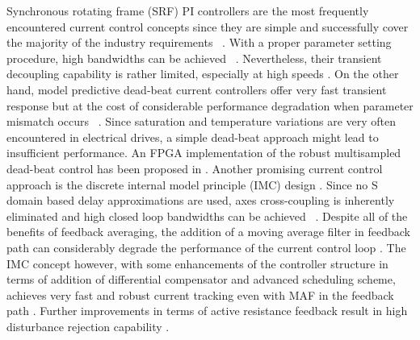 \documentclass[journal]{IEEEtran}
\begin{document}
Synchronous rotating frame (SRF) PI controllers are the most frequently encountered current control concepts since they are simple and successfully cover the majority of the industry requirements ~\cite{rowan1986,bae2003,yepes2014}. With a proper parameter setting procedure, high bandwidths can be achieved ~\cite{yepes2014,holmes2009}. Nevertheless, their transient decoupling capability is rather limited, especially at high speeds \cite{lorenz2000}. On the other hand, model predictive dead-beat current controllers offer very fast transient response but at the cost of considerable performance degradation when parameter mismatch occurs ~\cite{malesani1999,xu2019}. Since saturation and temperature variations are very often encountered in electrical drives, a simple dead-beat approach might lead to insufficient performance. An FPGA implementation of the robust multisampled dead-beat control has been proposed in \cite{rovere2018}. Another promising current control approach is the discrete internal model principle (IMC) design \cite{lorenz2010}. Since no S domain based delay approximations are used, axes cross-coupling is inherently eliminated and high closed loop bandwidths can be achieved ~\cite{commentsHoffmann,vuksa2016}. Despite all of the benefits of feedback averaging, the addition of a moving average filter in feedback path can considerably degrade the performance of the current control loop \cite{vuksa2016}. The IMC concept however, with some enhancements of the controller structure in terms of addition of differential compensator and advanced scheduling scheme, achieves very fast and robust current tracking even with MAF in the feedback path \cite{vuksa2017}. Further improvements in terms of active resistance feedback result in high disturbance rejection capability \cite{vuksa2018}. 
\end{document}
